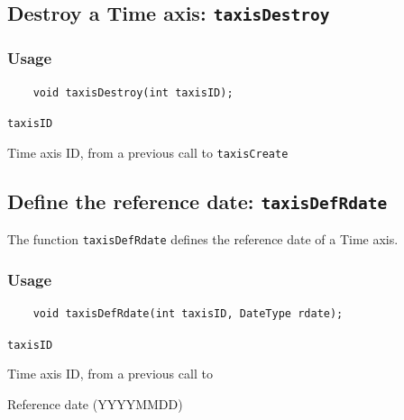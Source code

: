 \subsection{Destroy a Time axis: \texttt{taxisDestroy}}
\label{taxisDestroy}
\subsubsection*{Usage}

\begin{verbatim}
    void taxisDestroy(int taxisID);
\end{verbatim}

\hspace*{4mm}\begin{minipage}[]{15cm}
\begin{deflist}{\texttt{taxisID}\ }
\item[\texttt{taxisID}]
Time axis ID, from a previous call to {\texttt{taxisCreate}}

\end{deflist}
\end{minipage}


\subsection{Define the reference date: \texttt{taxisDefRdate}}
\label{taxisDefRdate}

The function {\texttt{taxisDefRdate}} defines the reference date of a Time axis.

\subsubsection*{Usage}

\begin{verbatim}
    void taxisDefRdate(int taxisID, DateType rdate);
\end{verbatim}

\hspace*{4mm}\begin{minipage}[]{15cm}
\begin{deflist}{\texttt{taxisID}\ }
\item[\texttt{taxisID}]
Time axis ID, from a previous call to {}
\item[\texttt{rdate}]
Reference date (YYYYMMDD)

\end{deflist}
\end{minipage}


